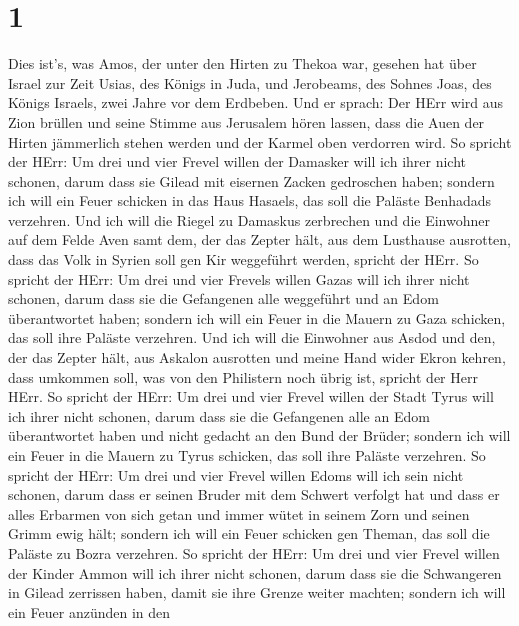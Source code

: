 \hypertarget{section}{%
\section{1}\label{section}}

 Dies ist's, was Amos, der unter den Hirten zu Thekoa war,
gesehen hat über Israel zur Zeit Usias, des Königs in Juda, und
Jerobeams, des Sohnes Joas, des Königs Israels, zwei Jahre vor dem
Erdbeben.  Und er sprach: Der HErr wird aus Zion brüllen und
seine Stimme aus Jerusalem hören lassen, dass die Auen der Hirten
jämmerlich stehen werden und der Karmel oben verdorren wird.
 So spricht der HErr: Um drei und vier Frevel willen der
Damasker will ich ihrer nicht schonen, darum dass sie Gilead mit
eisernen Zacken gedroschen haben;  sondern ich will ein
Feuer schicken in das Haus Hasaels, das soll die Paläste Benhadads
verzehren.  Und ich will die Riegel zu Damaskus zerbrechen
und die Einwohner auf dem Felde Aven samt dem, der das Zepter hält, aus
dem Lusthause ausrotten, dass das Volk in Syrien soll gen Kir weggeführt
werden, spricht der HErr.  So spricht der HErr: Um drei und
vier Frevels willen Gazas will ich ihrer nicht schonen, darum dass sie
die Gefangenen alle weggeführt und an Edom überantwortet haben;
 sondern ich will ein Feuer in die Mauern zu Gaza schicken,
das soll ihre Paläste verzehren.  Und ich will die Einwohner
aus Asdod und den, der das Zepter hält, aus Askalon ausrotten und meine
Hand wider Ekron kehren, dass umkommen soll, was von den Philistern noch
übrig ist, spricht der Herr HErr.  So spricht der HErr: Um
drei und vier Frevel willen der Stadt Tyrus will ich ihrer nicht
schonen, darum dass sie die Gefangenen alle an Edom überantwortet haben
und nicht gedacht an den Bund der Brüder;  sondern ich will
ein Feuer in die Mauern zu Tyrus schicken, das soll ihre Paläste
verzehren.  So spricht der HErr: Um drei und vier Frevel
willen Edoms will ich sein nicht schonen, darum dass er seinen Bruder
mit dem Schwert verfolgt hat und dass er alles Erbarmen von sich getan
und immer wütet in seinem Zorn und seinen Grimm ewig hält; 
sondern ich will ein Feuer schicken gen Theman, das soll die Paläste zu
Bozra verzehren.  So spricht der HErr: Um drei und vier
Frevel willen der Kinder Ammon will ich ihrer nicht schonen, darum dass
sie die Schwangeren in Gilead zerrissen haben, damit sie ihre Grenze
weiter machten;  sondern ich will ein Feuer anzünden in den
